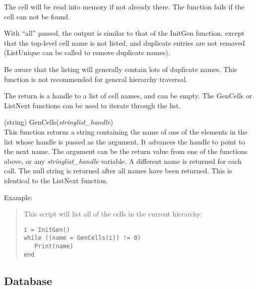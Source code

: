\begin{description}
The cell will be read into memory if not already there.  The function
fails if the cell can not be found.

With ``{\vt all}'' passed, the output is similar to that of the {\vt
InitGen} function, except that the top-level cell name is not listed,
and duplicate entries are not removed ({\vt ListUnique} can be called
to remove duplicate names).

Be aware that the listing will generally contain lots of duplicate
names.  This function is not recommended for general hierarchy
traversal.

The return is a handle to a list of cell names, and can be empty.  The
{\vt GenCells} or {\vt ListNext} functions can be used to iterate
through the list.

\item{(string) \vt GenCells({\it stringlist\_handle})}\\
This function returns a string containing the name of one of the
elements in the list whose handle is passed as the argument.  It
advances the handle to point to the next name.  The argument can be
the return value from one of the functions above, or any {\it
stringlist\_handle} variable.  A different name is returned for each
call.  The null string is returned after all names have been returned. 
This is identical to the {\vt ListNext} function.

Example:
\begin{quote}
This script will list all of the cells in the current hierarchy:
\begin{verbatim}
i = InitGen()
while ((name = GenCells(i)) != 0)
   Print(name)
end
\end{verbatim}
\end{quote}

\end{description}


\subsection{Database}

